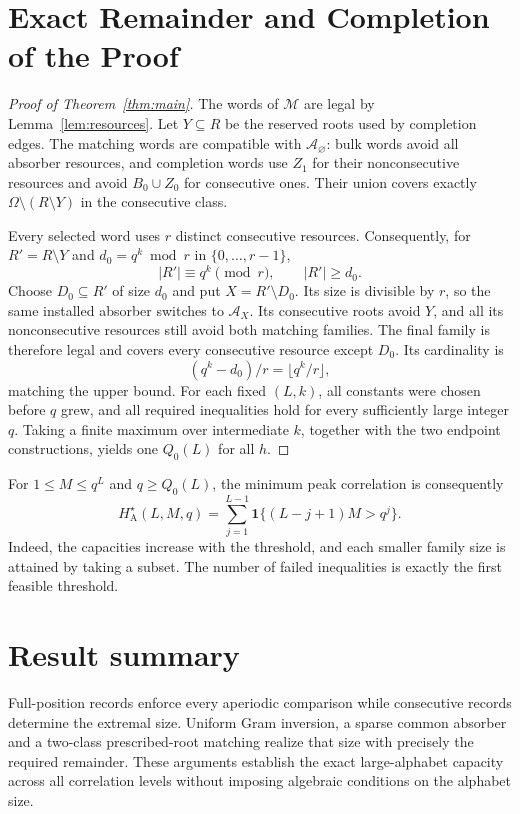 \documentclass[12pt,letterpaper,onecolumn]{article}
\theoremstyle{definition}
\newcommand{\Hstar}{H_{\mathrm A}^{\star}}
\newcommand{\ind}{\mathbf 1}
\newcommand{\cA}{\mathcal A}
\newcommand{\cM}{\mathcal M}
\begin{document}
\section{Exact Remainder and Completion of the Proof}
\begin{proof}[Proof of Theorem~\ref{thm:main}]
The words of $\cM$ are legal by Lemma~\ref{lem:resources}. Let $Y\subseteq R$ be the reserved roots used by completion edges. The matching words are compatible with $\cA_\varnothing$: bulk words avoid all absorber resources, and completion words use $Z_1$ for their nonconsecutive resources and avoid $B_0\cup Z_0$ for consecutive ones. Their union covers exactly $\Omega\setminus(R\setminus Y)$ in the consecutive class.

Every selected word uses $r$ distinct consecutive resources. Consequently, for $R'=R\setminus Y$ and $d_0=q^k\bmod r$ in $\{0,\ldots,r-1\}$,
\[
 |R'|\equiv q^k\pmod r,\qquad |R'|\ge d_0.
\]
Choose $D_0\subseteq R'$ of size $d_0$ and put $X=R'\setminus D_0$. Its size is divisible by $r$, so the same installed absorber switches to $\cA_X$. Its consecutive roots avoid $Y$, and all its nonconsecutive resources still avoid both matching families. The final family is therefore legal and covers every consecutive resource except $D_0$. Its cardinality is
\[
 (q^k-d_0)/r=\lfloor q^k/r\rfloor,
\]
matching the upper bound. For each fixed $(L,k)$, all constants were chosen before $q$ grew, and all required inequalities hold for every sufficiently large integer $q$. Taking a finite maximum over intermediate $k$, together with the two endpoint constructions, yields one $Q_0(L)$ for all $h$.
\end{proof}

For $1\le M\le q^L$ and $q\ge Q_0(L)$, the minimum peak correlation is consequently
\begin{equation}
 \Hstar(L,M,q)=\sum_{j=1}^{L-1}\ind\{(L-j+1)M>q^j\}.
 \label{eq:minpeak}
\end{equation}
Indeed, the capacities increase with the threshold, and each smaller family size is attained by taking a subset. The number of failed inequalities is exactly the first feasible threshold.

\section{Result summary}
Full-position records enforce every aperiodic comparison while consecutive records determine the extremal size. Uniform Gram inversion, a sparse common absorber and a two-class prescribed-root matching realize that size with precisely the required remainder. These arguments establish the exact large-alphabet capacity across all correlation levels without imposing algebraic conditions on the alphabet size.
\end{document}
